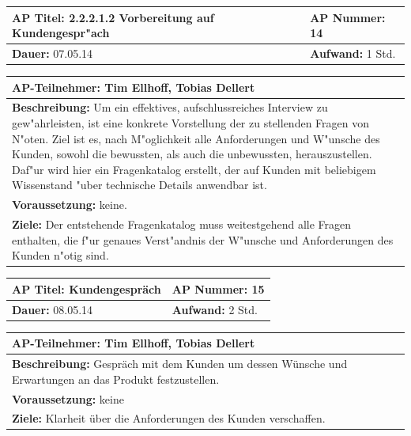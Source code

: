 \documentclass[fontsize=12pt,paper=a4,twoside]{scrartcl}
\begin{document}
\begin{tabular}{|p{7.43cm}|p{7.43cm}|}
\hline
\textbf{AP Titel: }2.2.2.1.2 Vorbereitung auf Kundengespr"ach & \textbf{AP Nummer: }14\\ 
\hline
\textbf{Dauer: }07.05.14 & \textbf{Aufwand: } 1 Std.\\
\hline
\end{tabular}
\begin{tabular}{|p{15.3cm}|}
\hline
\textbf{AP-Teilnehmer: }Tim Ellhoff, Tobias Dellert\\
\hline
\textbf{Beschreibung: }Um ein effektives, aufschlussreiches Interview zu gew"ahrleisten, ist eine konkrete Vorstellung der zu stellenden Fragen von N"oten. Ziel ist es, nach M"oglichkeit alle Anforderungen und W"unsche des Kunden, sowohl die bewussten, als auch die unbewussten, herauszustellen. Daf"ur wird hier ein Fragenkatalog erstellt, der auf Kunden mit beliebigem Wissenstand "uber technische Details anwendbar ist.\\
\hline
\textbf{Voraussetzung: }keine.\\
\hline 
\textbf{Ziele: }Der entstehende Fragenkatalog muss weitestgehend alle Fragen enthalten, die f"ur genaues Verst"andnis der W"unsche und Anforderungen des Kunden n"otig sind.\\
\hline 
\end{tabular}

\begin{tabular}{|p{7.43cm}|p{7.43cm}|}
\hline
\textbf{AP Titel: } Kundengespräch & \textbf{AP Nummer:} 15 \\ 
\hline
\textbf{Dauer: }08.05.14 & \textbf{Aufwand: }2 Std.\\
\hline
\end{tabular}
\begin{tabular}{|p{15.3cm}|}
\hline
\textbf{AP-Teilnehmer: }Tim Ellhoff, Tobias Dellert\\
\hline
\textbf{Beschreibung: }Gespräch mit dem Kunden um dessen Wünsche und Erwartungen an das Produkt festzustellen.\\
\hline
\textbf{Voraussetzung: }keine\\
\hline 
\textbf{Ziele: }Klarheit über die Anforderungen des Kunden verschaffen.\\
\hline 
\end{tabular}
\end{document}

